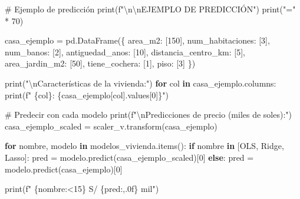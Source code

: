 \documentclass[
  doc,
  floatsintext,
  longtable,
  a4paper,
  nolmodern,
  notxfonts,
  notimes,
  12pt,
  colorlinks=true,linkcolor=blue,citecolor=blue,urlcolor=blue]{apa7}
\newenvironment{Shaded}{\begin{snugshade}}{\end{snugshade}}
\newcommand{\BuiltInTok}[1]{\textcolor[rgb]{0.00,0.23,0.31}{#1}}
\newcommand{\CharTok}[1]{\textcolor[rgb]{0.13,0.47,0.30}{#1}}
\newcommand{\CommentTok}[1]{\textcolor[rgb]{0.37,0.37,0.37}{#1}}
\newcommand{\ControlFlowTok}[1]{\textcolor[rgb]{0.00,0.23,0.31}{\textbf{#1}}}
\newcommand{\DecValTok}[1]{\textcolor[rgb]{0.68,0.00,0.00}{#1}}
\newcommand{\KeywordTok}[1]{\textcolor[rgb]{0.00,0.23,0.31}{\textbf{#1}}}
\newcommand{\NormalTok}[1]{\textcolor[rgb]{0.00,0.23,0.31}{#1}}
\newcommand{\OperatorTok}[1]{\textcolor[rgb]{0.37,0.37,0.37}{#1}}
\newcommand{\SpecialCharTok}[1]{\textcolor[rgb]{0.37,0.37,0.37}{#1}}
\newcommand{\SpecialStringTok}[1]{\textcolor[rgb]{0.13,0.47,0.30}{#1}}
\newcommand{\StringTok}[1]{\textcolor[rgb]{0.13,0.47,0.30}{#1}}
\begin{document}
\begin{Shaded}
\begin{Highlighting}[]
\CommentTok{\# Ejemplo de predicción}
\BuiltInTok{print}\NormalTok{(}\SpecialStringTok{f"}\CharTok{\textbackslash{}n\textbackslash{}n}\SpecialStringTok{EJEMPLO DE PREDICCIÓN"}\NormalTok{)}
\BuiltInTok{print}\NormalTok{(}\StringTok{"="} \OperatorTok{*} \DecValTok{70}\NormalTok{)}

\NormalTok{casa\_ejemplo }\OperatorTok{=}\NormalTok{ pd.DataFrame(\{}
    \StringTok{\textquotesingle{}area\_m2\textquotesingle{}}\NormalTok{: [}\DecValTok{150}\NormalTok{],}
    \StringTok{\textquotesingle{}num\_habitaciones\textquotesingle{}}\NormalTok{: [}\DecValTok{3}\NormalTok{],}
    \StringTok{\textquotesingle{}num\_banos\textquotesingle{}}\NormalTok{: [}\DecValTok{2}\NormalTok{],}
    \StringTok{\textquotesingle{}antiguedad\_anos\textquotesingle{}}\NormalTok{: [}\DecValTok{10}\NormalTok{],}
    \StringTok{\textquotesingle{}distancia\_centro\_km\textquotesingle{}}\NormalTok{: [}\DecValTok{5}\NormalTok{],}
    \StringTok{\textquotesingle{}area\_jardin\_m2\textquotesingle{}}\NormalTok{: [}\DecValTok{50}\NormalTok{],}
    \StringTok{\textquotesingle{}tiene\_cochera\textquotesingle{}}\NormalTok{: [}\DecValTok{1}\NormalTok{],}
    \StringTok{\textquotesingle{}piso\textquotesingle{}}\NormalTok{: [}\DecValTok{3}\NormalTok{]}
\NormalTok{\})}

\BuiltInTok{print}\NormalTok{(}\StringTok{"}\CharTok{\textbackslash{}n}\StringTok{Características de la vivienda:"}\NormalTok{)}
\ControlFlowTok{for}\NormalTok{ col }\KeywordTok{in}\NormalTok{ casa\_ejemplo.columns:}
    \BuiltInTok{print}\NormalTok{(}\SpecialStringTok{f"  }\SpecialCharTok{\{}\NormalTok{col}\SpecialCharTok{\}}\SpecialStringTok{: }\SpecialCharTok{\{}\NormalTok{casa\_ejemplo[col]}\SpecialCharTok{.}\NormalTok{values[}\DecValTok{0}\NormalTok{]}\SpecialCharTok{\}}\SpecialStringTok{"}\NormalTok{)}

\CommentTok{\# Predecir con cada modelo}
\BuiltInTok{print}\NormalTok{(}\SpecialStringTok{f"}\CharTok{\textbackslash{}n}\SpecialStringTok{Predicciones de precio (miles de soles):"}\NormalTok{)}
\NormalTok{casa\_ejemplo\_scaled }\OperatorTok{=}\NormalTok{ scaler\_v.transform(casa\_ejemplo)}

\ControlFlowTok{for}\NormalTok{ nombre, modelo }\KeywordTok{in}\NormalTok{ modelos\_vivienda.items():}
    \ControlFlowTok{if}\NormalTok{ nombre }\KeywordTok{in}\NormalTok{ [}\StringTok{\textquotesingle{}OLS\textquotesingle{}}\NormalTok{, }\StringTok{\textquotesingle{}Ridge\textquotesingle{}}\NormalTok{, }\StringTok{\textquotesingle{}Lasso\textquotesingle{}}\NormalTok{]:}
\NormalTok{        pred }\OperatorTok{=}\NormalTok{ modelo.predict(casa\_ejemplo\_scaled)[}\DecValTok{0}\NormalTok{]}
    \ControlFlowTok{else}\NormalTok{:}
\NormalTok{        pred }\OperatorTok{=}\NormalTok{ modelo.predict(casa\_ejemplo)[}\DecValTok{0}\NormalTok{]}
    
    \BuiltInTok{print}\NormalTok{(}\SpecialStringTok{f"  }\SpecialCharTok{\{}\NormalTok{nombre}\SpecialCharTok{:\textless{}15\}}\SpecialStringTok{ S/ }\SpecialCharTok{\{}\NormalTok{pred}\SpecialCharTok{:,.0f\}}\SpecialStringTok{ mil"}\NormalTok{)}
\end{Highlighting}
\end{Shaded}
\end{document}
